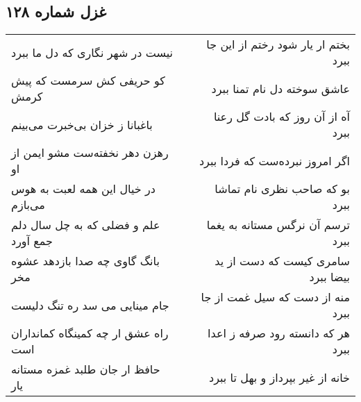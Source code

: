 \begin{center}
\section*{غزل شماره ۱۲۸}
\label{sec:sh128}
\begin{longtable}{l p{0.5cm} r}
نیست در شهر نگاری که دل ما ببرد
&&
بختم ار یار شود رختم از این جا ببرد
\\
کو حریفی کش سرمست که پیش کرمش
&&
عاشق سوخته دل نام تمنا ببرد
\\
باغبانا ز خزان بی‌خبرت می‌بینم
&&
آه از آن روز که بادت گل رعنا ببرد
\\
رهزن دهر نخفته‌ست مشو ایمن از او
&&
اگر امروز نبرده‌ست که فردا ببرد
\\
در خیال این همه لعبت به هوس می‌بازم
&&
بو که صاحب نظری نام تماشا ببرد
\\
علم و فضلی که به چل سال دلم جمع آورد
&&
ترسم آن نرگس مستانه به یغما ببرد
\\
بانگ گاوی چه صدا بازدهد عشوه مخر
&&
سامری کیست که دست از ید بیضا ببرد
\\
جام مینایی می سد ره تنگ دلیست
&&
منه از دست که سیل غمت از جا ببرد
\\
راه عشق ار چه کمینگاه کمانداران است
&&
هر که دانسته رود صرفه ز اعدا ببرد
\\
حافظ ار جان طلبد غمزه مستانه یار
&&
خانه از غیر بپرداز و بهل تا ببرد
\\
\end{longtable}
\end{center}
